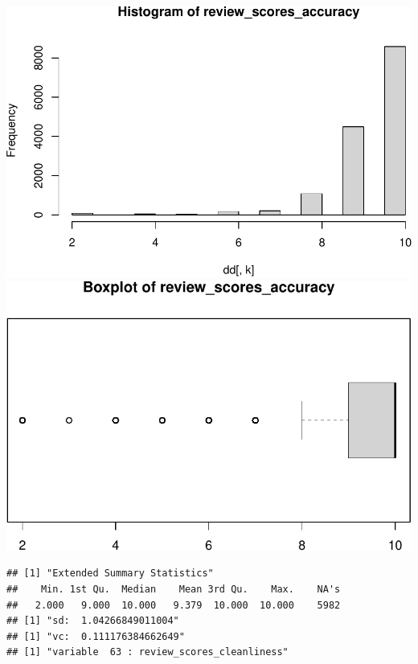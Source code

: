 \includegraphics{anal_files/figure-latex/unnamed-chunk-7-48.pdf}
\includegraphics{anal_files/figure-latex/unnamed-chunk-7-49.pdf}

\begin{verbatim}
## [1] "Extended Summary Statistics"
##    Min. 1st Qu.  Median    Mean 3rd Qu.    Max.    NA's 
##   2.000   9.000  10.000   9.379  10.000  10.000    5982 
## [1] "sd:  1.04266849011004"
## [1] "vc:  0.111176384662649"
## [1] "variable  63 : review_scores_cleanliness"
\end{verbatim}

